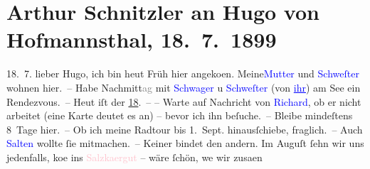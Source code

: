

               \section[Arthur Schnitzler an Hugo von Hofmannsthal, 18. 7. 1899]{ Arthur Schnitzler an Hugo von Hofmannsthal,
                    18. 7. 1899}\nopagebreak{}\rehead{ }\normalsize\beginnumbering{} \toendnotes[C]{\smallbreak\pagebreak[2]} 
\toendnotes[C]{\smallbreak}\pstart
           \raggedleft{}{\pb}18. 7.\pend
           \pstart
           lieber Hugo, ich bin heut Früh hier angeko{\geminationm}en. \introOben{}Meine\introOben{}{ }\textcolor{blue}{Mutter}{} und \textcolor{blue}{Schweſter}{} wohnen hier. – Habe
                    Nachmitt\textcolor{gray}{ag} mit \textcolor{blue}{Schwager}{} u
                        \textcolor{blue}{Schweſter}{} (von \textcolor{blue}{\uline{ihr}}{}) am See ein Rendezvous. – Heut iſt der \uline{18}. – – Warte auf Nachricht von \textcolor{blue}{Richard}{}\ledrightnote{\textcolor{blue}{Richard Beer-Hofmann}}, ob er nicht arbeitet (eine Karte deutet es an) – bevor ich
                    ihn beſuche. – Bleibe mindeſtens 8 Tage hier. – Ob ich meine Radtour
                    bis 1. Sept. hinausſchiebe, fraglich. – Auch \textcolor{blue}{Salten}{}\ledrightnote{\textcolor{blue}{Felix Salten}} wollte ſie mitmachen. – Keiner
                    bindet {\pb}den andern. Im Auguſt{ }ſehn wir
                    uns jedenfalls, ko{\geminationm}e ins \textcolor{pink}{Salzka{\geminationm}ergut}{}\ledrightnote{\textcolor{pink}{Salzkammergut}} – wäre ſchön,
                        we{\geminationn} wir zusa{\geminationm}en
